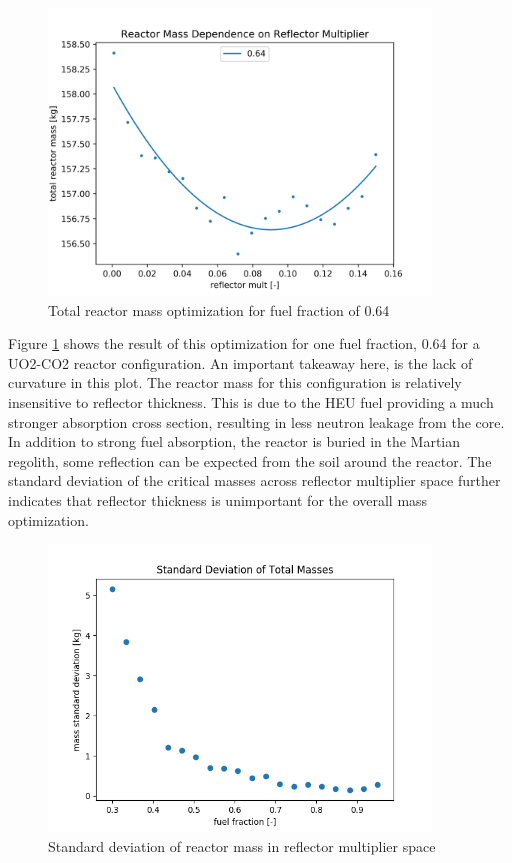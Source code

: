 \begin{figure}[h]
    \centering
    \includegraphics[width=4in]{../images/mass_mult_064.png}
\caption{Total reactor mass optimization for fuel fraction of 0.64}
\label{fig:mass_mult_one}
\end{figure}

Figure \ref{fig:mass_mult_one} shows the result of this optimization for one
fuel fraction, 0.64 for a UO2-CO2 reactor configuration. An important takeaway here, is the lack of curvature in
this plot. The reactor mass for this configuration is relatively insensitive to
reflector thickness. This is due to the HEU fuel providing a much
stronger absorption cross section, resulting in less neutron leakage from the core. In
addition to strong fuel absorption, the reactor is buried in the Martian
regolith, some reflection can be expected from the soil around the reactor.
The standard deviation of the critical masses across reflector multiplier space
further indicates that reflector thickness is unimportant for the overall mass
optimization.

\begin{figure}[h]
    \centering
    \includegraphics[width=4in]{../images/mass_std_uo2_co2.png}
\caption{Standard deviation of reactor mass in reflector multiplier space}
\label{fig:mass_std_co2_uo2}
\end{figure}


